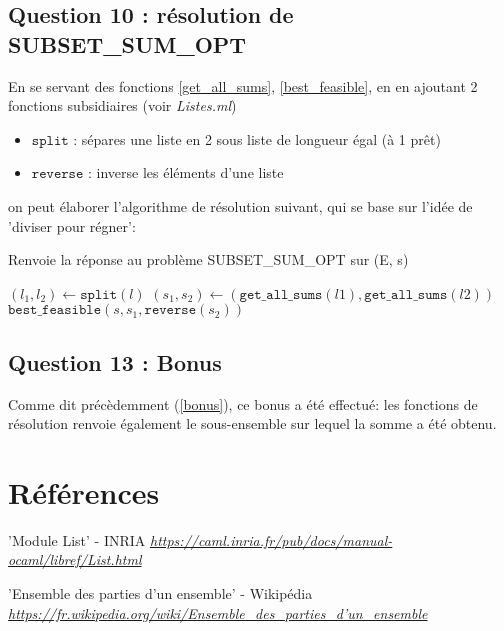 \documentclass[10pt]{article}
\let\oldReturn\Return
\renewcommand{\Return}{\State\oldReturn}
\begin{document}
			\subsection{Question 10 : résolution de SUBSET\_SUM\_OPT}
				En se servant des fonctions \ref{get_all_sums}, \ref{best_feasible},
				en en ajoutant 2 fonctions subsidiaires (voir \textit{Listes.ml})
				\begin{itemize}[label=-]
					\setlength\itemsep{0.1em}
					\item $\mathtt{split}$ : sépares une liste en 2 sous liste de longueur égal (à 1 prêt)
					\item $\mathtt{reverse}$ : inverse les éléments d'une liste
				\end{itemize}
				on peut élaborer l'algorithme de résolution suivant, qui se base sur l'idée de 'diviser pour régner':
				\begin{algorithm}
					\caption{Renvoie la réponse au problème SUBSET\_SUM\_OPT sur (E, s)}
					\begin{algorithmic}[1]
							\State $(l_1, l_2) \leftarrow \mathtt{split}(l)$
							\State $(s_1, s_2) \leftarrow (\mathtt{get\_all\_sums}(l1), \mathtt{get\_all\_sums}(l2))$
							\Return $\mathtt{best\_feasible}(s, s_1, \mathtt{reverse}(s_2))$
						\EndFunction
					\end{algorithmic}
				\end{algorithm}
				
			\subsection{Question 13 : Bonus}
				Comme dit précèdemment (\ref{bonus}), ce bonus a été effectué: les fonctions de résolution renvoie également
				le sous-ensemble sur lequel la somme a été obtenu.

	\newpage
	\section{Références}
		\begin{thebibliography}{}
				'Module List' - INRIA\newline
				\href{https://caml.inria.fr/pub/docs/manual-ocaml/libref/List.html}
				      {\textit{https://caml.inria.fr/pub/docs/manual-ocaml/libref/List.html}}
				      
				'Ensemble des parties d'un ensemble' - Wikipédia\newline
				\href{https://fr.wikipedia.org/wiki/Ensemble\_des\_parties\_d'un\_ensemble}
				      {\textit{https://fr.wikipedia.org/wiki/Ensemble\_des\_parties\_d'un\_ensemble}}
				      
  \end{thebibliography}
\end{document}
